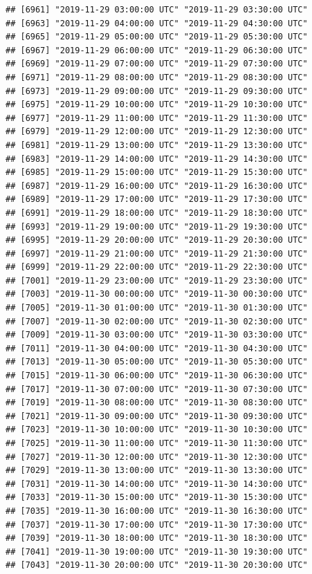 \documentclass{article}\usepackage[]{graphicx}\usepackage[]{color}
\makeatletter
\newenvironment{kframe}{%
 \def\at@end@of@kframe{}%
 \ifinner\ifhmode%
  \def\at@end@of@kframe{\end{minipage}}%
  \begin{minipage}{\columnwidth}%
 \fi\fi%
 \def\FrameCommand##1{\hskip\@totalleftmargin \hskip-\fboxsep
 \colorbox{shadecolor}{##1}\hskip-\fboxsep
     \hskip-\linewidth \hskip-\@totalleftmargin \hskip\columnwidth}%
 \MakeFramed {\advance\hsize-\width
   \@totalleftmargin\z@ \linewidth\hsize
   \@setminipage}}%
 {\par\unskip\endMakeFramed%
 \at@end@of@kframe}
\newenvironment{knitrout}{}{} %
\makeatother
\begin{document}
\begin{knitrout}
\begin{kframe}
\begin{verbatim}
## [6961] "2019-11-29 03:00:00 UTC" "2019-11-29 03:30:00 UTC"
## [6963] "2019-11-29 04:00:00 UTC" "2019-11-29 04:30:00 UTC"
## [6965] "2019-11-29 05:00:00 UTC" "2019-11-29 05:30:00 UTC"
## [6967] "2019-11-29 06:00:00 UTC" "2019-11-29 06:30:00 UTC"
## [6969] "2019-11-29 07:00:00 UTC" "2019-11-29 07:30:00 UTC"
## [6971] "2019-11-29 08:00:00 UTC" "2019-11-29 08:30:00 UTC"
## [6973] "2019-11-29 09:00:00 UTC" "2019-11-29 09:30:00 UTC"
## [6975] "2019-11-29 10:00:00 UTC" "2019-11-29 10:30:00 UTC"
## [6977] "2019-11-29 11:00:00 UTC" "2019-11-29 11:30:00 UTC"
## [6979] "2019-11-29 12:00:00 UTC" "2019-11-29 12:30:00 UTC"
## [6981] "2019-11-29 13:00:00 UTC" "2019-11-29 13:30:00 UTC"
## [6983] "2019-11-29 14:00:00 UTC" "2019-11-29 14:30:00 UTC"
## [6985] "2019-11-29 15:00:00 UTC" "2019-11-29 15:30:00 UTC"
## [6987] "2019-11-29 16:00:00 UTC" "2019-11-29 16:30:00 UTC"
## [6989] "2019-11-29 17:00:00 UTC" "2019-11-29 17:30:00 UTC"
## [6991] "2019-11-29 18:00:00 UTC" "2019-11-29 18:30:00 UTC"
## [6993] "2019-11-29 19:00:00 UTC" "2019-11-29 19:30:00 UTC"
## [6995] "2019-11-29 20:00:00 UTC" "2019-11-29 20:30:00 UTC"
## [6997] "2019-11-29 21:00:00 UTC" "2019-11-29 21:30:00 UTC"
## [6999] "2019-11-29 22:00:00 UTC" "2019-11-29 22:30:00 UTC"
## [7001] "2019-11-29 23:00:00 UTC" "2019-11-29 23:30:00 UTC"
## [7003] "2019-11-30 00:00:00 UTC" "2019-11-30 00:30:00 UTC"
## [7005] "2019-11-30 01:00:00 UTC" "2019-11-30 01:30:00 UTC"
## [7007] "2019-11-30 02:00:00 UTC" "2019-11-30 02:30:00 UTC"
## [7009] "2019-11-30 03:00:00 UTC" "2019-11-30 03:30:00 UTC"
## [7011] "2019-11-30 04:00:00 UTC" "2019-11-30 04:30:00 UTC"
## [7013] "2019-11-30 05:00:00 UTC" "2019-11-30 05:30:00 UTC"
## [7015] "2019-11-30 06:00:00 UTC" "2019-11-30 06:30:00 UTC"
## [7017] "2019-11-30 07:00:00 UTC" "2019-11-30 07:30:00 UTC"
## [7019] "2019-11-30 08:00:00 UTC" "2019-11-30 08:30:00 UTC"
## [7021] "2019-11-30 09:00:00 UTC" "2019-11-30 09:30:00 UTC"
## [7023] "2019-11-30 10:00:00 UTC" "2019-11-30 10:30:00 UTC"
## [7025] "2019-11-30 11:00:00 UTC" "2019-11-30 11:30:00 UTC"
## [7027] "2019-11-30 12:00:00 UTC" "2019-11-30 12:30:00 UTC"
## [7029] "2019-11-30 13:00:00 UTC" "2019-11-30 13:30:00 UTC"
## [7031] "2019-11-30 14:00:00 UTC" "2019-11-30 14:30:00 UTC"
## [7033] "2019-11-30 15:00:00 UTC" "2019-11-30 15:30:00 UTC"
## [7035] "2019-11-30 16:00:00 UTC" "2019-11-30 16:30:00 UTC"
## [7037] "2019-11-30 17:00:00 UTC" "2019-11-30 17:30:00 UTC"
## [7039] "2019-11-30 18:00:00 UTC" "2019-11-30 18:30:00 UTC"
## [7041] "2019-11-30 19:00:00 UTC" "2019-11-30 19:30:00 UTC"
## [7043] "2019-11-30 20:00:00 UTC" "2019-11-30 20:30:00 UTC"

\end{verbatim}
\end{kframe}
\end{knitrout}
\end{document}
